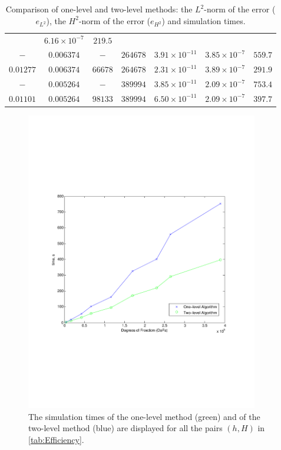 \begin{table}
\begin{center}
{\begin{tabular}{|c|c|c|c|c|c|c|}
        & $6.16\times 10^{-7}$ & $219.5$ \\[0.2em]
      $-$         & $0.006374$  & $-$       & $264678$  & $3.91\times 10^{-11}$
      & $3.85\times 10^{-7}$ & $559.7$ \\[0.2em]
      $0.01277$   & $0.006374$  & $66678$   & $264678$  & $2.31\times 10^{-11}$
        & $3.89\times 10^{-7}$ & $291.9$\\[0.2em]
      $-$         & $0.005264$  & $-$       & $389994$  & $3.85\times 10^{-11}$
        & $2.09\times 10^{-7}$ & $753.4$ \\[0.2em]
      $0.01101$   & $0.005264$  & $98133$   & $389994$  & $6.50\times 10^{-11}$
        & $2.09\times 10^{-7}$ & $397.7$ \\[0.2em]
      \hline
    \end{tabular}}
  \end{center}
  \caption{Comparison of one-level and two-level methods: the $L^2$-norm of the
    error ($e_{L^2}$), the $H^2$-norm of the error ($e_{H^2}$) and simulation
    times.}
  \label{tab:Efficiency}
\end{table}

\begin{center}
  \begin{figure}
    \begin{center}
    \includegraphics[width=4in,natwidth=610,natheight=642]{Figures/performanceplot.pdf}
    \caption{The simulation times of the one-level method (green) and of the
      two-level method (blue) are displayed for all the pairs $(h,H)$ in
      \autoref{tab:Efficiency}.}
    \label{fig:Efficiency}
    \end{center}
  \end{figure}
\end{center}

